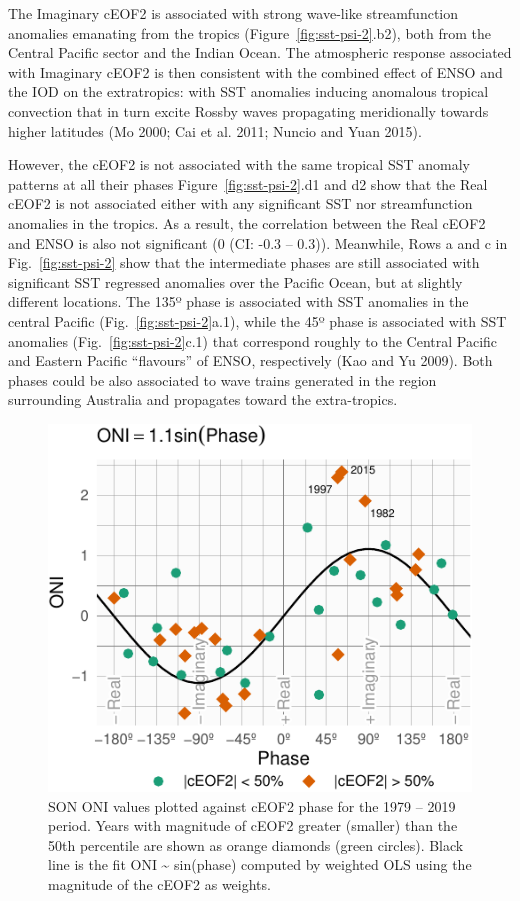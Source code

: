 \documentclass[smallextended]{svjour3}       %
\begin{document}
The Imaginary cEOF2 is associated with strong wave-like streamfunction anomalies emanating from the tropics (Figure~\ref{fig:sst-psi-2}.b2), both from the Central Pacific sector and the Indian Ocean.
The atmospheric response associated with Imaginary cEOF2 is then consistent with the combined effect of ENSO and the IOD on the extratropics: with SST anomalies inducing anomalous tropical convection that in turn excite Rossby waves propagating meridionally towards higher latitudes (Mo 2000; Cai et al. 2011; Nuncio and Yuan 2015).

However, the cEOF2 is not associated with the same tropical SST anomaly patterns at all their phases
Figure~\ref{fig:sst-psi-2}.d1 and d2 show that the Real cEOF2 is not associated either with any significant SST nor streamfunction anomalies in the tropics.
As a result, the correlation between the Real cEOF2 and ENSO is also not significant (0 (CI: -0.3 -- 0.3)).
Meanwhile, Rows a and c in Fig.~\ref{fig:sst-psi-2} show that the intermediate phases are still associated with significant SST regressed anomalies over the Pacific Ocean, but at slightly different locations.
The 135º phase is associated with SST anomalies in the central Pacific (Fig.~\ref{fig:sst-psi-2}a.1), while the 45º phase is associated with SST anomalies (Fig.~\ref{fig:sst-psi-2}c.1) that correspond roughly to the Central Pacific and Eastern Pacific ``flavours'' of ENSO, respectively (Kao and Yu 2009).
Both phases could be also associated to wave trains generated in the region surrounding Australia and propagates toward the extra-tropics.



\begin{figure}
\centering
\includegraphics{../figures/enso-phase-1.pdf}
\caption{\label{fig:enso-phase}SON ONI values plotted against cEOF2 phase for the 1979 -- 2019 period. Years with magnitude of cEOF2 greater (smaller) than the 50th percentile are shown as orange diamonds (green circles). Black line is the fit ONI \textasciitilde{} sin(phase) computed by weighted OLS using the magnitude of the cEOF2 as weights.}
\end{figure}
\end{document}
